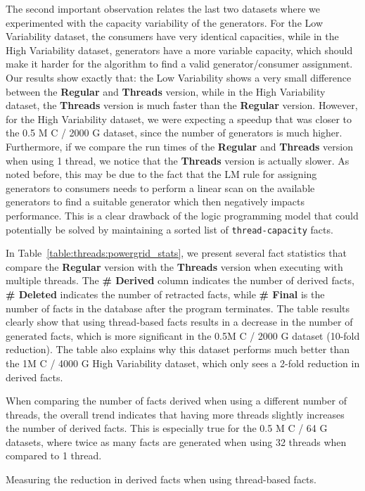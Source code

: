 The second important observation relates the last two datasets where we
experimented with the capacity variability of the generators. For the Low
Variability dataset, the consumers have very identical capacities, while in the
High Variability dataset, generators have a more variable capacity, which should
make it harder for the algorithm to find a valid generator/consumer assignment.
Our results show exactly that: the Low Variability shows a very small difference
between the \textbf{Regular} and \textbf{Threads} version, while in the High
Variability dataset, the \textbf{Threads} version is much faster than the
\textbf{Regular} version. However, for the High Variability dataset, we were
expecting a speedup that was closer to the 0.5 M C / 2000 G dataset, since the
number of generators is much higher. Furthermore, if we compare the run times of
the \textbf{Regular} and \textbf{Threads} version when using 1 thread, we notice
that the \textbf{Threads} version is actually slower. As noted before, this may
be due to the fact that the LM rule for assigning generators to consumers needs
to perform a linear scan on the available generators to find a suitable
generator which then negatively impacts performance. This is a clear drawback of
the logic programming model that could potentially be solved by maintaining a
sorted list of \texttt{thread-capacity} facts.


In Table~\ref{table:threads:powergrid_stats}, we present several fact statistics
that compare the \textbf{Regular} version with the \textbf{Threads} version when
executing with multiple threads. The \textbf{\# Derived} column indicates the
number of derived facts, \textbf{\# Deleted} indicates the number of retracted
facts, while \textbf{\# Final} is the number of facts in the database after the
program terminates. The table results clearly show that using thread-based facts
results in a decrease in the number of generated facts, which is more
significant in the 0.5M C / 2000 G dataset (10-fold reduction). The table also
explains why this dataset performs much better than the 1M C / 4000 G High
Variability dataset, which only sees a 2-fold reduction in derived facts.

When comparing the number of facts derived when using a different number of
threads, the overall trend indicates that having more threads slightly increases
the number of derived facts. This is especially true for the 0.5 M C / 64 G
datasets, where twice as many facts are generated when using 32 threads when
compared to 1 thread.

\begin{table}[ht]
   \begin{center}
      
   \end{center}

   \caption{Measuring the reduction in derived facts when using thread-based
   facts.}
   \label{table:threads:powergrid_stats}
\end{table}

